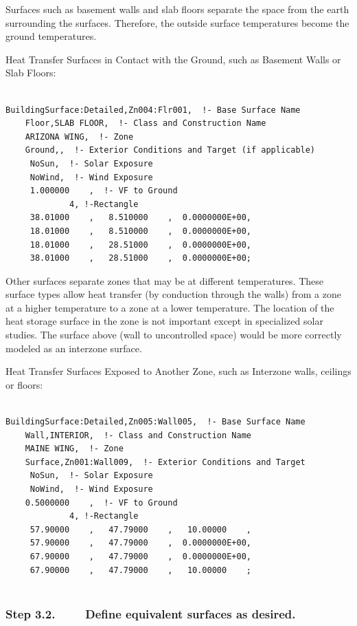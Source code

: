 Surfaces such as basement walls and slab floors separate the space from the earth surrounding the surfaces. Therefore, the outside surface temperatures become the ground temperatures.

Heat Transfer Surfaces in Contact with the Ground, such as Basement Walls or Slab Floors:

\begin{lstlisting}

BuildingSurface:Detailed,Zn004:Flr001,  !- Base Surface Name
    Floor,SLAB FLOOR,  !- Class and Construction Name
    ARIZONA WING,  !- Zone
    Ground,,  !- Exterior Conditions and Target (if applicable)
     NoSun,  !- Solar Exposure
     NoWind,  !- Wind Exposure
     1.000000    ,  !- VF to Ground
             4, !-Rectangle
     38.01000    ,   8.510000    ,  0.0000000E+00,
     18.01000    ,   8.510000    ,  0.0000000E+00,
     18.01000    ,   28.51000    ,  0.0000000E+00,
     38.01000    ,   28.51000    ,  0.0000000E+00;
\end{lstlisting}

Other surfaces separate zones that may be at different temperatures. These surface types allow heat transfer (by conduction through the walls) from a zone at a higher temperature to a zone at a lower temperature. The location of the heat storage surface in the zone is not important except in specialized solar studies. The surface above (wall to uncontrolled space) would be more correctly modeled as an interzone surface.

Heat Transfer Surfaces Exposed to Another Zone, such as Interzone walls, ceilings or floors:

\begin{lstlisting}

BuildingSurface:Detailed,Zn005:Wall005,  !- Base Surface Name
    Wall,INTERIOR,  !- Class and Construction Name
    MAINE WING,  !- Zone
    Surface,Zn001:Wall009,  !- Exterior Conditions and Target
     NoSun,  !- Solar Exposure
     NoWind,  !- Wind Exposure
    0.5000000    ,  !- VF to Ground
             4, !-Rectangle
     57.90000    ,   47.79000    ,   10.00000    ,
     57.90000    ,   47.79000    ,  0.0000000E+00,
     67.90000    ,   47.79000    ,  0.0000000E+00,
     67.90000    ,   47.79000    ,   10.00000    ;
   
\end{lstlisting}

\subsubsection{Step 3.2.~~~~ Define equivalent surfaces as desired.}\label{step-3.2.-define-equivalent-surfaces-as-desired.}


